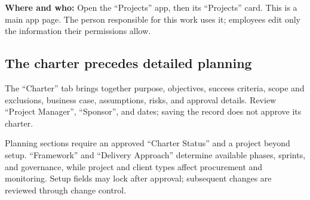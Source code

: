 \textbf{Where and who:} Open the “Projects” app, then its “Projects” card. This is a main app page. The person responsible for this work uses it; employees edit only the information their permissions allow.

\subsection{The charter precedes detailed planning}
The “Charter” tab brings together purpose, objectives, success criteria, scope and exclusions, business case, assumptions, risks, and approval details. Review “Project Manager”, “Sponsor”, and dates; saving the record does not approve its charter.

Planning sections require an approved “Charter Status” and a project beyond setup. “Framework” and “Delivery Approach” determine available phases, sprints, and governance, while project and client types affect procurement and monitoring. Setup fields may lock after approval; subsequent changes are reviewed through change control.


